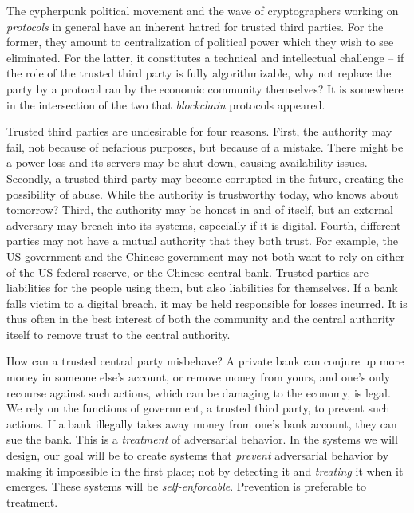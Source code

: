 The cypherpunk political movement and the wave of
cryptographers working on \emph{protocols} in general have an inherent hatred
for trusted third parties. For the former, they amount to
centralization of political power which they wish to see eliminated. For the
latter, it constitutes a technical and intellectual challenge -- if the role of the trusted
third party is fully algorithmizable, why not replace the party by a protocol
ran by the economic community themselves? It is somewhere in the intersection of the
two that \emph{blockchain} protocols appeared.

Trusted third parties are undesirable for four reasons.
First, the authority may fail, not because of nefarious purposes, but because of a mistake.
There might be a power loss and its servers may be shut down, causing availability issues.
Secondly, a trusted third party
may become corrupted in the future, creating the possibility of abuse. While the authority
is trustworthy today, who knows about tomorrow?
Third, the
authority may be honest in and of itself, but an external adversary may breach into its
systems, especially if it is digital.
Fourth, different parties may not have a mutual authority that they both trust.
For example, the US government and the Chinese government may not both want to rely
on either of the US federal reserve, or the Chinese central bank.
Trusted parties are liabilities for the people using them, but also liabilities for
themselves. If a bank falls victim to a digital breach, it may be held responsible
for losses incurred. It is thus often in the best interest of both the community and
the central authority itself to remove trust to the central authority.

How can a trusted central party misbehave?
A private bank can conjure up more money in someone else's account, or remove money
from yours, and one's only recourse against such actions, which can be damaging
to the economy, is legal. We rely on the functions of government, a trusted third
party, to prevent such actions. If a bank illegally takes away money from one's
bank account, they can sue the bank. This is a \emph{treatment} of adversarial
behavior. In the systems we will design, our goal will be to create systems that
\emph{prevent} adversarial behavior by making it impossible in the first place;
not by detecting it and \emph{treating} it when it emerges.
These systems will be \emph{self-enforcable}.
Prevention is preferable to treatment.

